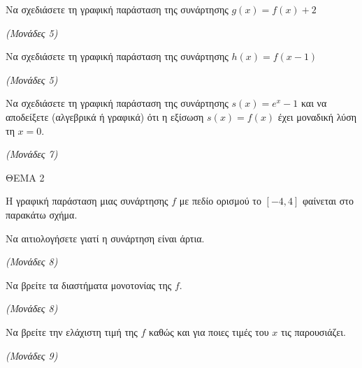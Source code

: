 \documentclass[11pt,a4paper,twoside]{book}
\newcommand{\monades}[1]{\hfill \textit{(Μονάδες #1)}}
\begin{document}
\begin{alist}
\item Να σχεδιάσετε τη γραφική παράσταση της συνάρτησης $g(x) = f(x) + 2$

\monades{5}

\item Να σχεδιάσετε τη γραφική παράσταση της συνάρτησης $h(x) = f(x - 1)$

\monades{5}

\item Να σχεδιάσετε τη γραφική παράσταση της συνάρτησης $s(x) = e^x - 1$ και να αποδείξετε (αλγεβρικά ή γραφικά) ότι η εξίσωση $s(x) = f(x)$ έχει μοναδική λύση τη $x = 0$.

\monades{7}
\end{alist}

\vspace{4mm}

ΘΕΜΑ 2

Η γραφική παράσταση μιας συνάρτησης $f$ με πεδίο ορισμού το $[-4, 4]$ φαίνεται στο παρακάτω σχήμα.

\begin{center}
\end{center}

\begin{alist}
\item Να αιτιολογήσετε γιατί η συνάρτηση είναι άρτια.

\monades{8}

\item Να βρείτε τα διαστήματα μονοτονίας της $f$.

\monades{8}

\item Να βρείτε την ελάχιστη τιμή της $f$ καθώς και για ποιες τιμές του $x$ τις παρουσιάζει.

\monades{9}
\end{alist}
\end{document}
